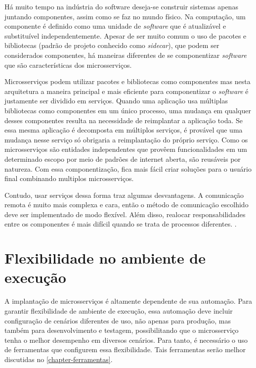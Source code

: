 Há muito tempo na indústria do software deseja-se construir sistemas apenas juntando componentes, assim como se faz no mundo físico. Na computação, um componente é definido como uma unidade de \emph{software} que é atualizável e substituível independentemente. Apesar de ser muito comum o uso de pacotes e bibliotecas (padrão de projeto conhecido como \emph{sidecar}), que podem ser considerados componentes, há maneiras diferentes de se componentizar \emph{software} que são características dos microsserviços. \cite{MartinFowlerMicroservices}

Microsserviços podem utilizar pacotes e bibliotecas como componentes mas nesta arquitetura a maneira principal e mais eficiente para componentizar o \emph{software} é justamente ser dividido em serviços. Quando uma aplicação usa múltiplas bibliotecas como componentes em um único processo, uma mudança em qualquer desses componentes resulta na necessidade de reimplantar a aplicação toda. Se essa mesma aplicação é decomposta em múltiplos serviços, é provável que uma mudança nesse serviço só obrigaria a reimplantação do próprio serviço. Como os microsserviços são entidades independentes que provêem funcionalidades em um determinado escopo por meio de padrões de internet aberta, são reusáveis por natureza. Com essa componentização, fica mais fácil criar soluções para o usuário final combinando multiplos microsserviços. \cite{MartinFowlerMicroservices,Familiar2015}

Contudo, usar serviços dessa forma traz algumas desvantagens. A comunicação remota é muito mais complexa e cara, então o método de comunicação escolhido deve ser implementado de modo flexível. Além disso, realocar responsabilidades entre os componentes é mais difícil quando se trata de processos diferentes. \cite{MartinFowlerMicroservices}.

\section{Flexibilidade no ambiente de execução}

A implantação de microsserviços é altamente dependente de sua automação. Para garantir flexibilidade de ambiente de execução, essa automação deve incluir configuração de cenários diferentes de uso, não apenas para produção, mas também para desenvolvimento e testagem, possibilitando que o microsserviço tenha o melhor desempenho em diversos cenários. Para tanto, é necessário o uso de ferramentas que configurem essa flexibilidade. Tais ferramentas serão melhor discutidas no \autoref{chapter-ferramentas}. \cite{Familiar2015}

